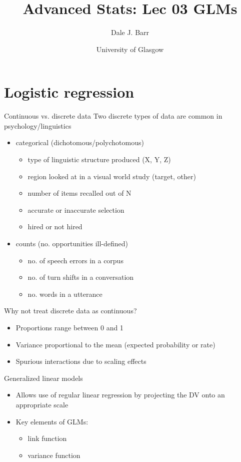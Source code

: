 \documentclass[presentation]{beamer}
\author{Dale J. Barr}
\date{University of Glasgow}
\title{Advanced Stats: Lec 03 GLMs}
\begin{document}
\maketitle

\section*{Logistic regression}
\label{sec:orgf0dc53b}

\begin{frame}[label={sec:orgc7ebca5}]{Continuous vs. discrete data}
Two discrete types of data are common in psychology/linguistics

\begin{itemize}
\item categorical (dichotomous/polychotomous)
\begin{itemize}
\item type of linguistic structure produced (X, Y, Z)
\item region looked at in a visual world study (target, other)
\item number of items recalled out of N
\item accurate or inaccurate selection
\item hired or not hired
\end{itemize}

\item counts (no. opportunities ill-defined)
\begin{itemize}
\item no. of speech errors in a corpus
\item no. of turn shifts in a conversation
\item no. words in a utterance
\end{itemize}
\end{itemize}
\end{frame}

\begin{frame}[label={sec:orgbae2718}]{Why not treat discrete data as continuous?}
\begin{itemize}
\item Proportions range between 0 and 1
\item Variance proportional to the mean (expected probability or rate)
\item Spurious interactions due to scaling effects
\end{itemize}
\end{frame}

\begin{frame}[label={sec:orgfe6b67d}]{Generalized linear models}
\begin{itemize}
\item Allows use of regular linear regression by projecting the DV onto an
appropriate scale

\item Key elements of GLMs: 
\begin{itemize}
\item link function
\item variance function
\end{itemize}
\end{itemize}
\end{frame}
\end{document}
